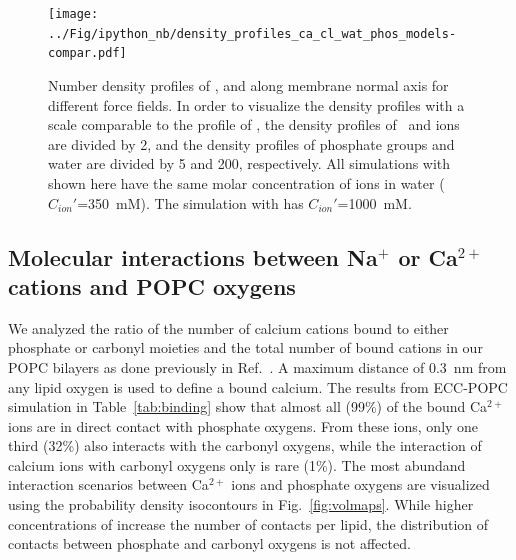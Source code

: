 \documentclass[journal=jpcbfk,manuscript=article]{achemso}
\begin{document}
\begin{figure}[htbp!]
  \centering
  \texttt{[image: ../Fig/ipython\_nb/density\_profiles\_ca\_cl\_wat\_phos\_models-compar.pdf]}
  \caption{\label{fig:cacl-dens}
    Number density profiles of ,  and  along membrane normal axis
    for different force fields.
    In order to visualize the density profiles with a scale comparable to the profile of , 
    the density profiles of~ and  ions are divided by 2, and
    the density profiles of phosphate groups and water are divided by 5 and 200, respectively. 
    All simulations with  shown here have the same molar concentration of ions in water ($C_{ion}'$=350~mM).
    The simulation with  has $C_{ion}'$=1000~mM.
    }
\end{figure}

\subsection{Molecular interactions between Na$^+$ or Ca$^{2+}$ cations and POPC oxygens}
We analyzed the ratio of the number of calcium cations bound to either phosphate or carbonyl moieties and the total number of bound cations in our POPC bilayers as done previously in Ref.~. A maximum distance of 0.3~nm from any lipid oxygen is used to define a bound calcium. The results from ECC-POPC simulation in Table~\ref{tab:binding} show that almost all (99\%) of the bound Ca$^{2+}$ ions are in direct contact with phosphate oxygens. From these ions, only one third (32\%) also interacts with the carbonyl oxygens, while the interaction of calcium ions with carbonyl oxygens only is rare (1\%). The most abundand interaction scenarios between Ca$^{2+}$ ions and phosphate oxygens are visualized using the probability density isocontours in Fig.~\ref{fig:volmaps}. While higher concentrations of  increase the number of contacts per lipid, the distribution of contacts between phosphate and carbonyl oxygens is not affected.
\end{document}
